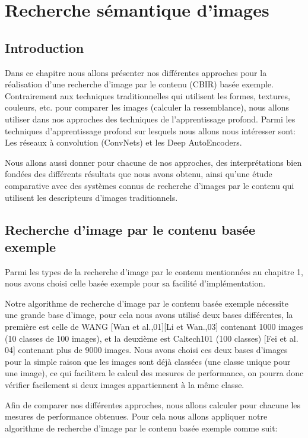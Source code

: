 
\chapter{Recherche sémantique d'images} %

\section{Introduction}
	Dans ce chapitre nous allons présenter nos différentes approches pour la réalisation d'une recherche d'image par le contenu (CBIR) basée exemple. Contrairement aux techniques traditionnelles qui utilisent les formes, textures, couleurs, etc. pour comparer les images (calculer la ressemblance), nous allons utiliser dans nos approches des techniques de l'apprentissage profond. Parmi les techniques d'apprentissage profond sur lesquels nous allons nous intéresser sont: Les réseaux à convolution (ConvNets) et les Deep AutoEncoders. 
	
	Nous allons aussi donner pour chacune de nos approches, des interprétations bien fondées des différents résultats que nous avons obtenu, ainsi qu'une étude comparative avec des systèmes connus de recherche d'images par le contenu qui utilisent les descripteurs d'images traditionnels.
	


\section{Recherche d'image par le contenu basée exemple}
	Parmi les types de la recherche d'image par le contenu mentionnées au chapitre 1, nous avons choisi celle basée exemple pour sa facilité d'implémentation.
	
	Notre algorithme de recherche d'image par le contenu basée exemple nécessite une grande base d'image, pour cela nous avons utilisé deux bases différentes, la première est celle de WANG [Wan et al.,01][Li et Wan.,03] contenant 1000 images (10 classes de 100 images), et la deuxième est Caltech101 (100 classes) [Fei et al. 04] contenant plus de 9000 images. Nous avons choisi ces deux bases d'images pour la simple raison que les images sont déjà classées (une classe unique pour une image), ce qui facilitera le calcul des mesures de performance, on pourra donc vérifier facilement si deux images appartiennent à la même classe.
	
	Afin de comparer nos différentes approches, nous allons calculer pour chacune les mesures de performance obtenues. Pour cela nous allons appliquer notre algorithme de recherche d'image par le contenu basée exemple comme suit:


